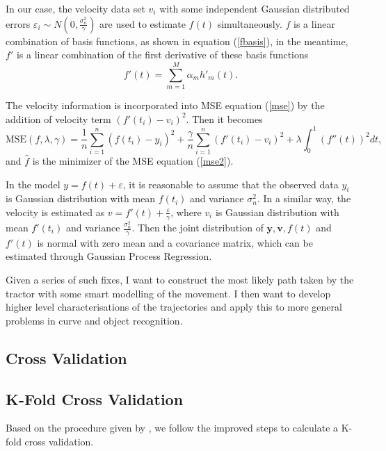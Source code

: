 In our case, the velocity data set $v_i$ with some independent Gaussian distributed errors $\varepsilon_i \sim N(0, \frac{\sigma_n^2}{\gamma})$ are used to estimate $f(t)$ simultaneously. $f$ is a linear combination of basis functions, as shown in equation (\ref{fbasis}), in the meantime, $f'$ is a linear combination of the first derivative of these basis functions
\begin{equation}
f'(t) =\sum_{m=1}^{M}\alpha_mh'_m(t).
\end{equation}

The velocity information  is incorporated into MSE  equation (\ref{mse}) by the addition of velocity term $(f'(t_i)-v_i)^2$. Then it becomes 
\begin{equation}\label{mse2}
\text{MSE}(f,\lambda,\gamma)=\frac{1}{n}\sum_{i=1}^n(f(t_i)-y_i)^2+\frac{\gamma}{n} \sum_{i=1}^n(f'(t_i)-v_i)^2+\lambda \int_{0}^{1}(f''(t))^2dt,
\end{equation}
and $\hat{f}$ is the minimizer of the MSE equation (\ref{mse2}).

In the model $y=f(t)+\varepsilon$, it is reasonable to assume that the observed data $y_i$ is Gaussian distribution with mean $f(t_i)$ and variance $\sigma_n^2$. In a similar way, the velocity is estimated as  $v=f'(t)+\frac{\varepsilon}{\gamma}$, where $v_i$ is Gaussian distribution with mean $f'(t_i)$ and variance $\frac{\sigma_n^2}{\gamma}$. Then the joint distribution of $\mathbf{y},\mathbf{v},f(t)$ and $f'(t)$ is normal with zero mean and a covariance matrix, which can be estimated through Gaussian Process Regression.


Given a series of such fixes, I want to construct the most likely path taken by the tractor with some smart modelling of the movement. I then want to develop higher level characterisations of the trajectories and apply this to more general problems in curve and object recognition.



\subsection{Cross Validation}

\subsection{K-Fold Cross Validation}

Based on the procedure given by \cite{wahba1975completely}, we  follow the improved steps to calculate a K-fold cross validation. 


